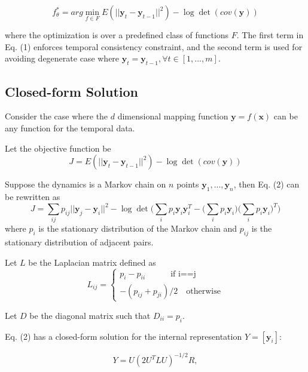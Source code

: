 \documentclass{article}
\begin{document}
\begin{equation}
f_\theta^* =arg \min_{f \in F} E(||\mathbf{y}_t - \mathbf{y}_{t-1}||^2) - \log\det(cov(\mathbf{y}))
\end{equation}

where the optimization is over a predefined class of functions $F$. The first
term in Eq. (1) enforces temporal consistency constraint, and the second
term is used for avoiding degenerate case where $\mathbf{y}_t = \mathbf{y}_{t-1}, \forall t \in
 [1,...,m]$.

\subsection{Closed-form Solution}
Consider the case where the $d$ dimensional mapping function $\mathbf{y}=f(\mathbf{x})$ can be
any function for the temporal data.

Let the objective function be
\begin{equation}
J = E(||\mathbf{y}_t - \mathbf{y}_{t-1}||^2) - \log\det(cov(\mathbf{y}))
\end{equation}

Suppose the dynamics is a Markov chain on $n$ points ${\mathbf{y}_1, ..., \mathbf{y}_n}$, then
Eq. (2) can be rewritten as
\begin{equation}
J = \sum_{ij}p_{ij}||\mathbf{y}_j - \mathbf{y}_i||^2 - \log\det\Bigg(\sum_ip_i\mathbf{y}_i\mathbf{y}_i^T-\bigg(\sum_ip_i\mathbf{y}_i\bigg)\bigg(\sum_ip_i\mathbf{y}_i\bigg)^T\Bigg)
\end{equation}
where $p_i$ is the stationary distribution of the Markov chain and $p_{ij}$ is 
the stationary distribution of adjacent pairs.

Let $L$ be the Laplacian matrix defined as
\begin{equation}
L_{ij} = \left\{\begin{matrix}
p_i-p_{ii} \qquad \quad \textrm{if i==j}\\ 
-(p_{ij} + p_{ji})/2 \quad \textrm{otherwise}
\end{matrix}\right.
\end{equation}

Let $D$ be the diagonal matrix such that $D_{ii} = p_i$.

Eq. (2) has a closed-form solution for the internal representation $Y = [\mathbf{y}_i]$:

\begin{equation}
Y = U(2U^TLU)^{-1/2}R,
\end{equation}
\end{document}
